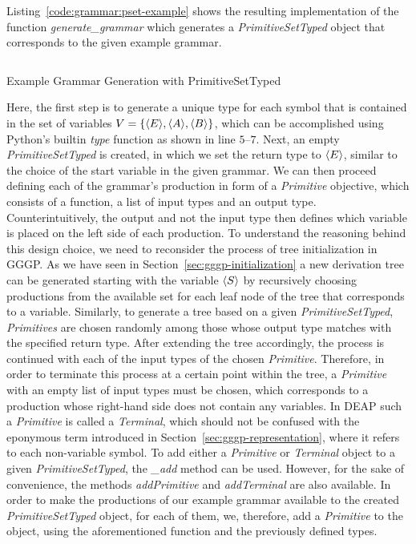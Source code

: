 Listing~\ref{code:grammar:pset-example} shows the resulting implementation of the function \emph{generate\_grammar} which generates a \emph{PrimitiveSetTyped} object that corresponds to the given example grammar.
\begin{listing}
	\inputminted[linenos]{python}{evostencils/grammar/pset_example.py}
	\caption{Example Grammar Generation with PrimitiveSetTyped}
	\label{code:grammar:pset-example}
\end{listing}
Here, the first step is to generate a unique type for each symbol that is contained in the set of variables $V = \left\{\langle E \rangle, \langle A \rangle, \langle B \rangle \right\}$, which can be accomplished using Python's builtin \emph{type} function as shown in line $5$--$7$.
Next, an empty \emph{PrimitiveSetTyped} is created, in which we set the return type to $\langle E \rangle$, similar to the choice of the start variable in the given grammar.
We can then proceed defining each of the grammar's production in form of a \emph{Primitive} objective, which consists of a function, a list of input types and an output type.
Counterintuitively, the output and not the input type then defines which variable is placed on the left side of each production.
To understand the reasoning behind this design choice, we need to reconsider the process of tree initialization in GGGP.
As we have seen in Section~\ref{sec:gggp-initialization} a new derivation tree can be generated starting with the variable $\langle S \rangle$ by recursively choosing productions from the available set for each leaf node of the tree that corresponds to a variable.
Similarly, to generate a tree based on a given \emph{PrimitiveSetTyped}, \emph{Primitives} are chosen randomly among those whose output type matches with the specified return type.
After extending the tree accordingly, the process is continued with each of the input types of the chosen \emph{Primitive}.
Therefore, in order to terminate this process at a certain point within the tree, a \emph{Primitive} with an empty list of input types must be chosen, which corresponds to a production whose right-hand side does not contain any variables.
In DEAP such a \emph{Primitive} is called a \emph{Terminal}, which should not be confused with the eponymous term introduced in Section~\ref{sec:gggp-representation}, where it refers to each non-variable symbol.
To add either a \emph{Primitive} or \emph{Terminal} object to a given \emph{PrimitiveSetTyped}, the \emph{\_add} method can be used.
However, for the sake of convenience, the methods \emph{addPrimitive} and \emph{addTerminal} are also available.
In order to make the productions of our example grammar available to the created \emph{PrimitiveSetTyped} object, for each of them, we, therefore, add a \emph{Primitive} to the object, using the aforementioned function and the previously defined types.
